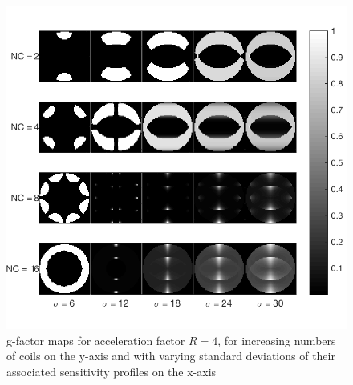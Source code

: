 \begin{figure}[H]
    \centering
    \includegraphics[width=1\textwidth,keepaspectratio]{R4gfactb}
    \caption{g-factor maps for acceleration factor $R = 4$, for increasing numbers of coils on the y-axis and with varying standard deviations of their associated sensitivity profiles on the x-axis}
    \label{fig:R4gfact}
\end{figure}


